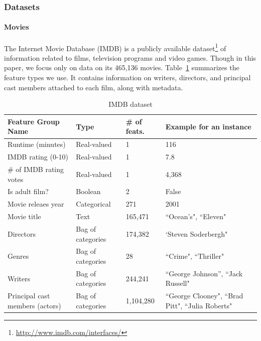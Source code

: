 \documentclass{article} %
\begin{document}
\subsubsection{Datasets}

\paragraph{Movies}
The Internet Movie Database (IMDB) is a publicly available dataset\footnote{\href{http://www.imdb.com/interfaces/}{http://www.imdb.com/interfaces/}} of information related to films, television programs and video games.
Though in this paper, we focus only on data on its 465,136 movies.
Table~\ref{tab:features} summarizes the feature types we use.
It contains information on writers, directors, and principal cast members attached to each film, along with  metadata.

\begin{table}[htb]
\footnotesize
\centering
\caption{IMDB dataset}
\label{tab:features}
\begin{tabular}{@{}lllp{6cm}@{}}
\toprule
Feature Group Name      & Type              & \# of feats. & Example for an instance                                      \\ \midrule
Runtime (minutes)       & Real-valued       & 1                 & 116                                                           \\
IMDB rating (0-10)      & Real-valued       & 1                 & 7.8                                                          \\
\# of IMDB rating votes & Real-valued       & 1                 & 4,368                                                          \\
Is adult film?          & Boolean           & 2                 & False                                                        \\
Movie releaes year      & Categorical          & 271               & 2001                                                         \\
Movie title             & Text      & 165,471           & ``Ocean's", ``Eleven"                                  \\
Directors               & Bag of categories & 174,382           & `Steven Soderbergh"                                     \\
Genres                  & Bag of categories & 28                &``Crime", ``Thriller"                                 \\
Writers                 & Bag of categories & 244,241           &``George Johnson'', ``Jack Russell"                      \\
Principal cast members (actors) & Bag of categories & 1,104,280         & ``George Clooney", ``Brad Pitt", ``Julia Roberts" \\\bottomrule
\end{tabular}
\end{table}
\end{document}
